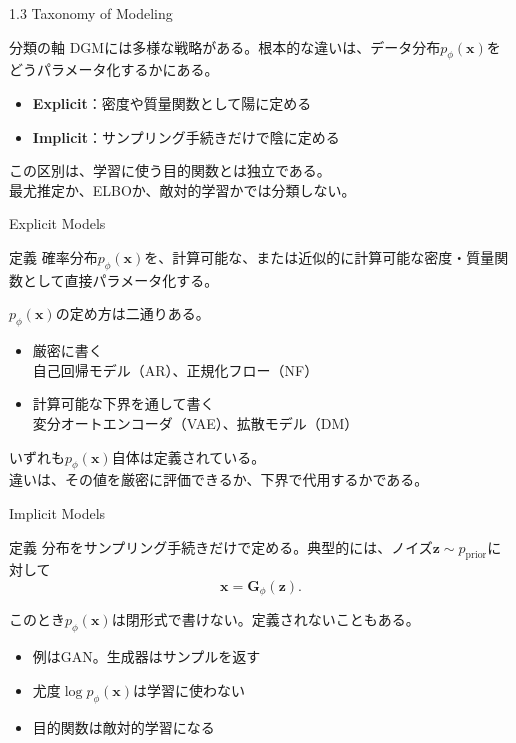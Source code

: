 \begin{frame}{1.3 Taxonomy of Modeling}
    \begin{block}{分類の軸}
        DGMには多様な戦略がある。根本的な違いは、データ分布\(p_{\phi}(\boldsymbol{x})\)をどうパラメータ化するかにある。
    \end{block}
    \vspace{0.6em}
    \begin{itemize}
        \item \textbf{Explicit}：密度や質量関数として陽に定める
        \item \textbf{Implicit}：サンプリング手続きだけで陰に定める
    \end{itemize}
    \vspace{0.4em}
    この区別は、学習に使う目的関数とは独立である。\\
    最尤推定か、ELBOか、敵対的学習かでは分類しない。
\end{frame}
\begin{frame}{Explicit Models}
    \begin{block}{定義}
        確率分布\(p_{\phi}(\boldsymbol{x})\)を、計算可能な、または近似的に計算可能な密度・質量関数として直接パラメータ化する。
    \end{block}
    \vspace{0.5em}
    \(p_{\phi}(\boldsymbol{x})\)の定め方は二通りある。
    \begin{itemize}
        \item 厳密に書く\\
        自己回帰モデル（AR）、正規化フロー（NF）
        \item 計算可能な下界を通して書く\\
        変分オートエンコーダ（VAE）、拡散モデル（DM）
    \end{itemize}
    \vspace{0.3em}
    いずれも\(p_{\phi}(\boldsymbol{x})\)自体は定義されている。\\
    違いは、その値を厳密に評価できるか、下界で代用するかである。
\end{frame}
\begin{frame}{Implicit Models}
    \begin{block}{定義}
        分布をサンプリング手続きだけで定める。典型的には、ノイズ\(\boldsymbol{z}\sim p_{\mathrm{prior}}\)に対して
        \[
            \boldsymbol{x}=\boldsymbol{G}_{\phi}(\boldsymbol{z}).
        \]
    \end{block}
    \vspace{0.4em}
    このとき\(p_{\phi}(\boldsymbol{x})\)は閉形式で書けない。定義されないこともある。
    \begin{itemize}
        \item 例はGAN。生成器はサンプルを返す
        \item 尤度\(\log p_{\phi}(\boldsymbol{x})\)は学習に使わない
        \item 目的関数は敵対的学習になる
    \end{itemize}
\end{frame}
